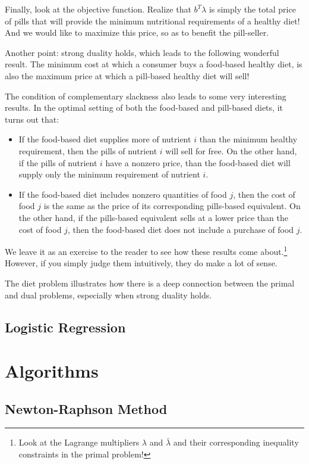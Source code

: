 \documentclass[a4paper]{article}
\theoremstyle{definition}
\begin{document}
Finally, look at the objective function.
Realize that $b^T \lambda$ is simply the total price of pills that will provide the minimum nutritional requirements of a healthy diet!
And we would like to maximize this price, so as to benefit the pill-seller.

Another point: strong duality holds, which leads to the following wonderful result.
The minimum cost at which a consumer buys a food-based healthy diet, is also the maximum price at which a pill-based healthy diet will sell!

The condition of complementary slackness also leads to some very interesting results.
In the optimal setting of both the food-based and pill-based diets, it turns out that:
\begin{itemize}
	\item If the food-based diet supplies more of nutrient $i$ than the minimum healthy requirement, then the pills of nutrient $i$ will sell for free.
		On the other hand, if the pills of nutrient $i$ have a nonzero price, than the food-based diet will supply only the minimum requirement of nutrient $i$.
	\item If the food-based diet includes nonzero quantities of food $j$, then the cost of food $j$ is the same as the price of its corresponding pills-based equivalent.
		On the other hand, if the pills-based equivalent sells at a lower price than the cost of food $j$, then the food-based diet does not include a purchase of food $j$.
\end{itemize}
We leave it as an exercise to the reader to see how these results come about.\footnote{
	Look at the Lagrange multipliers $\lambda$ and $\bar{\lambda}$ and their corresponding inequality constraints in the primal problem!
}
However, if you simply judge them intuitively, they do make a lot of sense.

The diet problem illustrates how there is a deep connection between the primal and dual problems, especially when strong duality holds.

\subsection{Logistic Regression}

\section{Algorithms}

\subsection{Newton-Raphson Method}
\end{document}
